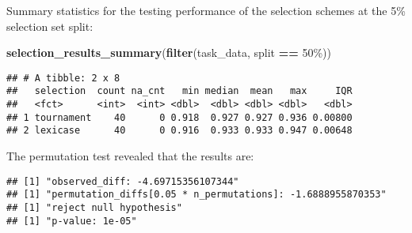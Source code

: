 \documentclass[
]{book}
\newenvironment{Shaded}{\begin{snugshade}}{\end{snugshade}}
\newcommand{\AttributeTok}[1]{\textcolor[rgb]{0.13,0.29,0.53}{#1}}
\newcommand{\DecValTok}[1]{\textcolor[rgb]{0.00,0.00,0.81}{#1}}
\newcommand{\FunctionTok}[1]{\textcolor[rgb]{0.13,0.29,0.53}{\textbf{#1}}}
\newcommand{\NormalTok}[1]{#1}
\newcommand{\OtherTok}[1]{\textcolor[rgb]{0.56,0.35,0.01}{#1}}
\newcommand{\SpecialCharTok}[1]{\textcolor[rgb]{0.81,0.36,0.00}{\textbf{#1}}}
\newcommand{\StringTok}[1]{\textcolor[rgb]{0.31,0.60,0.02}{#1}}
\begin{document}
Summary statistics for the testing performance of the selection schemes at the 5\% selection set split:

\begin{Shaded}
\begin{Highlighting}[]
\FunctionTok{selection\_results\_summary}\NormalTok{(}\FunctionTok{filter}\NormalTok{(task\_data, split }\SpecialCharTok{==} \StringTok{\textquotesingle{}50\%\textquotesingle{}}\NormalTok{))}
\end{Highlighting}
\end{Shaded}

\begin{verbatim}
## # A tibble: 2 x 8
##   selection  count na_cnt   min median  mean   max     IQR
##   <fct>      <int>  <int> <dbl>  <dbl> <dbl> <dbl>   <dbl>
## 1 tournament    40      0 0.918  0.927 0.927 0.936 0.00800
## 2 lexicase      40      0 0.916  0.933 0.933 0.947 0.00648
\end{verbatim}

The permutation test revealed that the results are:

\begin{Shaded}
\end{Shaded}

\begin{verbatim}
## [1] "observed_diff: -4.69715356107344"
## [1] "permutation_diffs[0.05 * n_permutations]: -1.6888955870353"
## [1] "reject null hypothesis"
## [1] "p-value: 1e-05"
\end{verbatim}
\end{document}

